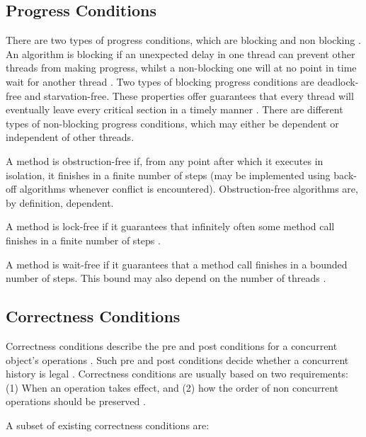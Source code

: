 \subsection{Progress Conditions}
There are two types of progress conditions, which are blocking and non blocking \cite[Chapter~3.7]{herlihy2020art}. An algorithm is blocking if an unexpected delay in one thread can prevent other threads from making progress, whilst a non-blocking one will at no point in time wait for another thread \cite[Chapter~3.7]{herlihy2020art}. Two types of blocking progress conditions are deadlock-free and starvation-free. These properties offer guarantees that every thread will eventually leave every critical section in a timely manner \cite[Chapter~3.7.1]{herlihy2020art}. There are different types of non-blocking progress conditions, which may either be dependent or independent of other threads. 

A method is obstruction-free if, from any point after which it executes in isolation, it finishes in a finite number of steps (may be implemented using back-off algorithms whenever conflict is encountered)\cite{herlihy2020art,herlihy2003obstruction}. Obstruction-free algorithms are, by definition, dependent.

A method is lock-free if it guarantees that infinitely often some method call finishes in a finite number of steps \cite{herlihy2020art}.

A method is wait-free if it guarantees that a method call finishes in a bounded number of steps. This bound may also depend on the number of threads \cite{herlihy2020art}.

\subsection{Correctness Conditions}

Correctness conditions describe the pre and post conditions for a concurrent object's operations \cite{herlihy2020art}. Such pre and post conditions decide whether a concurrent history is legal \cite{herlihy1990linearizability}. Correctness conditions are usually based on two requirements: (1) When an operation takes effect, and (2) how the order of non concurrent operations should be preserved \cite{herlihy1990linearizability}.

A subset of existing correctness conditions are:

